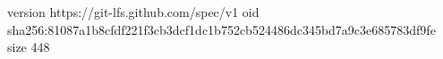 version https://git-lfs.github.com/spec/v1
oid sha256:81087a1b8cfdf221f3cb3dcf1dc1b752cb524486dc345bd7a9c3e685783df9fe
size 448
